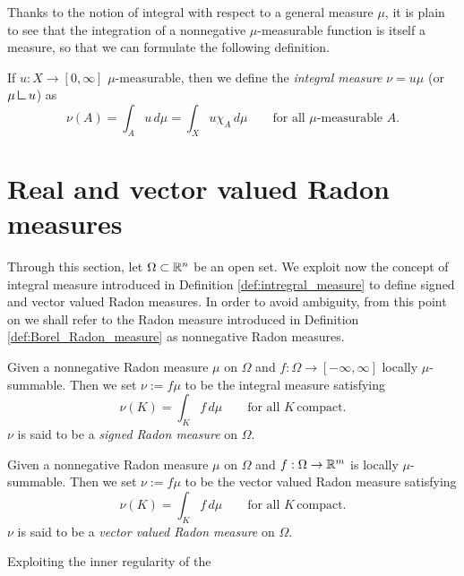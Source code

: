 Thanks to the notion of integral with respect to a general measure $\mu$, it is plain to see that the integration of a nonnegative $\mu$-measurable function is itself a measure, so that we can formulate the following definition.

\begin{definition} \label{def:intregral_measure}
If $u : X \to [0,\infty]$ $\mu$-measurable, then we define the {\em integral measure} $\nu = u \mu$ (or
$\mu \res u$) as 
\[
\nu(A) = \int_A u \, d\mu = \int_X u \chi_A \, d\mu 
\qquad \text{for all } \mu\text{-measurable } A.
\]
\end{definition}

\section{Real and vector valued Radon measures}

Through this section, let $\Omega \subset \mathbb{R}^{n}$ be an open set. We exploit now the concept of integral measure introduced in Definition \ref{def:intregral_measure} to define signed and vector valued Radon measures. In order to avoid ambiguity, from this point on we shall refer to the Radon measure introduced in Definition \ref{def:Borel_Radon_measure} as nonnegative Radon measures.

\begin{definition}
Given a nonnegative Radon measure $\mu$ on $\Omega$ and $f: \Omega \to
[-\infty,\infty]$ locally $\mu$-summable. Then we set $\nu := f \mu$ to be the integral measure satisfying
\[
\nu(K) = \int_K f \, d\mu 
\qquad \text{for all }  K \, \text{compact.}
\]
$\nu$ is said to be a \emph{signed Radon measure} on $\Omega$.
\end{definition}

\begin{definition}
Given a nonnegative Radon measure $\mu$ on $\Omega$ and $f: \Omega \to
\mathbb{R}^m$ is locally $\mu$-summable. Then we set $\nu := f \mu$ to be the vector valued Radon measure satisfying
\[
\nu(K) = \int_K f \, d\mu 
\qquad \text{for all }  K \, \text{compact.}
\]
$\nu$ is said to be a \emph{vector valued Radon measure} on $\Omega$.
\end{definition}

Exploiting the inner regularity of the 


